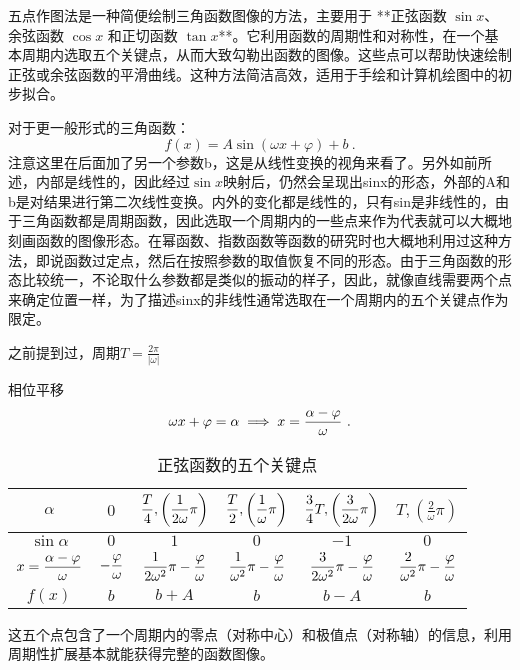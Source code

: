 五点作图法是一种简便绘制三角函数图像的方法，主要用于 **正弦函数 $\sin x$、余弦函数 $\cos x$ 和正切函数 $\tan x$**。它利用函数的周期性和对称性，在一个基本周期内选取五个关键点，从而大致勾勒出函数的图像。这些点可以帮助快速绘制正弦或余弦函数的平滑曲线。这种方法简洁高效，适用于手绘和计算机绘图中的初步拟合。

对于更一般形式的三角函数：
\begin{equation}
f(x) = A \sin(\omega x + \varphi) + b~.
\end{equation}
注意这里在后面加了另一个参数b，这是从线性变换的视角来看了。另外如前所述，内部是线性的，因此经过$\sin x$映射后，仍然会呈现出sinx的形态，外部的A和b是对结果进行第二次线性变换。内外的变化都是线性的，只有sin是非线性的，由于三角函数都是周期函数，因此选取一个周期内的一些点来作为代表就可以大概地刻画函数的图像形态。在幂函数、指数函数等函数的研究时也大概地利用过这种方法，即说函数过定点，然后在按照参数的取值恢复不同的形态。由于三角函数的形态比较统一，不论取什么参数都是类似的振动的样子，因此，就像直线需要两个点来确定位置一样，为了描述sinx的非线性通常选取在一个周期内的五个关键点作为限定。

之前提到过，周期$\displaystyle T = \frac{2\pi}{|\omega|}$

相位平移
\begin{equation}
\omega x + \varphi=\alpha\implies x={\alpha-\varphi\over \omega}~.
\end{equation}

\begin{table}[ht]
\centering
\caption{正弦函数的五个关键点}\label{tab_HsSinF1}
\begin{tabular}{|c|c|c|c|c|c|}
\hline
$\alpha$ & $0$ &$\displaystyle {T\over4},\left(\frac{1}{2\omega}\pi\right)$& $\displaystyle {T\over2},\left(\frac{1}{\omega}\pi\right)$ & $\displaystyle {3\over4}T,\left(\frac{3}{2\omega}\pi\right)$ & $\displaystyle T,\left(\frac{2}{\omega}\pi\right)$\\
\hline
$\sin \alpha$ & $0$&$1$&$0$&$-1$&$0$ \\
\hline
$x=\displaystyle{\alpha-\varphi\over \omega}$&$\displaystyle-{\varphi\over \omega}$&$\displaystyle{1\over 2\omega^2}\pi-{\varphi\over \omega}$&$\displaystyle{1\over \omega^2}\pi-{\varphi\over \omega}$&$\displaystyle{3\over 2\omega^2}\pi-{\varphi\over \omega}$&$\displaystyle{2\over \omega^2}\pi-{\varphi\over \omega}$\\
\hline
$f(x)$ & $b$&$b+A$&$b$&$b-A$&$b$ \\
\hline
\end{tabular}
\end{table}
这五个点包含了一个周期内的零点（对称中心）和极值点（对称轴）的信息，利用周期性扩展基本就能获得完整的函数图像。

